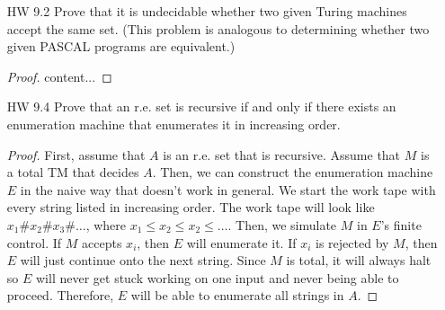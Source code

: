 \documentclass{article}
\newcommand{\ifff}{if and only if }
\newcommand{\setst}{\hspace{1mm} | \hspace{1mm} }
\theoremstyle{definition}
\begin{document}
\begin{enumerate}
\begin{proof}
		Denote the problem above as $A$. We will prove this by reducing $HP$ to $A$. Assume that $N$ is a TM that decides $A$. We can say that 
		\[L(N) = \{M\#x\#q \setst M \text{ reaches state } q \text{ on input } x\}.\]
		Let $M\#x$ be an instance of $HP$. Then consider the computable function $\sigma$ which maps $M\#x$ to $M\#x\#a$. Then, if $N$ halts on $M\#x\#a$, that means that $M$ reaches state $a$ which implies that $M$ halts on $x$. Since HP is undecidable, then $A$ must also be undecidable. 
	\end{proof}
	\item[HW 9.2] Prove that it is undecidable whether two given Turing machines accept
	the same set. (This problem is analogous to determining whether two
	given PASCAL programs are equivalent.)
	\begin{proof}
		content...
	\end{proof}
	\item[HW 9.4] Prove that an r.e. set is recursive \ifff there exists an enumeration
	machine that enumerates it in increasing order.
	\begin{proof}
		First, assume that $A$ is an r.e. set that is recursive. Assume that $M$ is a total TM that decides $A$. Then, we can construct the enumeration machine $E$ in the naive way that doesn't work in general. We start the work tape with every string listed in increasing order. The work tape will look like $x_1\#x_2\#x_3\#\ldots$, where $x_1 \leq x_2 \leq x_2 \leq \ldots$. Then, we simulate $M$ in $E$'s finite control. If $M$ accepts $x_i$, then $E$ will enumerate it. If $x_i$ is rejected by $M$, then $E$ will just continue onto the next string. Since $M$ is total, it will always halt so $E$ will never get stuck working on one input and never being able to proceed. Therefore, $E$ will be able to enumerate all strings in $A$. 
		

\end{proof}
\end{enumerate}
\end{document}
